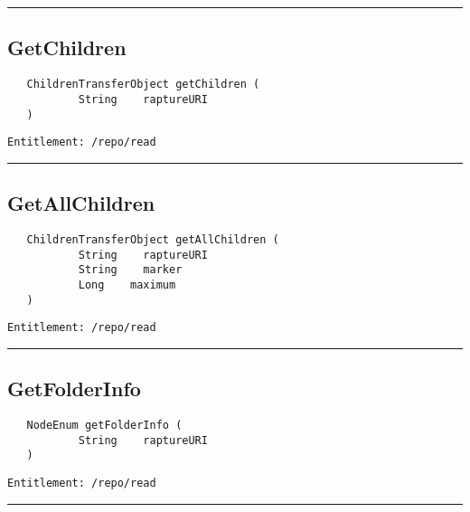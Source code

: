 \rule{12cm}{2pt}
\subsection{GetChildren}
\label{Api:GetChildren}
\begin{Verbatim}
   ChildrenTransferObject getChildren (
           String    raptureURI
   )
\end{Verbatim}
\begin{Verbatim}[formatcom=\color{Maroon}]
  Entitlement: /repo/read
\end{Verbatim}



\rule{12cm}{2pt}
\subsection{GetAllChildren}
\label{Api:GetAllChildren}
\begin{Verbatim}
   ChildrenTransferObject getAllChildren (
           String    raptureURI
           String    marker
           Long    maximum
   )
\end{Verbatim}
\begin{Verbatim}[formatcom=\color{Maroon}]
  Entitlement: /repo/read
\end{Verbatim}



\rule{12cm}{2pt}
\subsection{GetFolderInfo}
\label{Api:GetFolderInfo}
\begin{Verbatim}
   NodeEnum getFolderInfo (
           String    raptureURI
   )
\end{Verbatim}
\begin{Verbatim}[formatcom=\color{Maroon}]
  Entitlement: /repo/read
\end{Verbatim}



\rule{12cm}{2pt}
